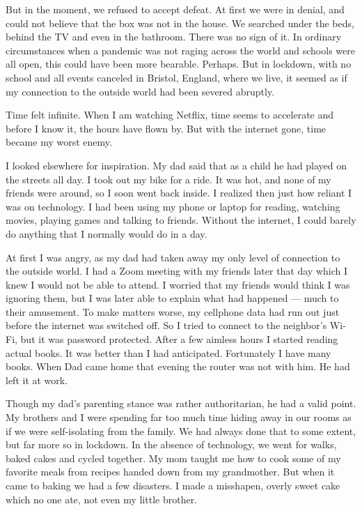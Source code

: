 But in the moment, we refused to accept defeat. At first we were in
denial, and could not believe that the box was not in the house. We
searched under the beds, behind the TV and even in the bathroom. There
was no sign of it. In ordinary circumstances when a pandemic was not
raging across the world and schools were all open, this could have been
more bearable. Perhaps. But in lockdown, with no school and all events
canceled in Bristol, England, where we live, it seemed as if my
connection to the outside world had been severed abruptly.

Time felt infinite. When I am watching Netflix, time seems to accelerate
and before I know it, the hours have flown by. But with the internet
gone, time became my worst enemy.

I looked elsewhere for inspiration. My dad said that as a child he had
played on the streets all day. I took out my bike for a ride. It was
hot, and none of my friends were around, so I soon went back inside. I
realized then just how reliant I was on technology. I had been using my
phone or laptop for reading, watching movies, playing games and talking
to friends. Without the internet, I could barely do anything that I
normally would do in a day.

At first I was angry, as my dad had taken away my only level of
connection to the outside world. I had a Zoom meeting with my friends
later that day which I knew I would not be able to attend. I worried
that my friends would think I was ignoring them, but I was later able to
explain what had happened --- much to their amusement. To make matters
worse, my cellphone data had run out just before the internet was
switched off. So I tried to connect to the neighbor's Wi-Fi, but it was
password protected. After a few aimless hours I started reading actual
books. It was better than I had anticipated. Fortunately I have many
books. When Dad came home that evening the router was not with him. He
had left it at work.

Though my dad's parenting stance was rather authoritarian, he had a
valid point. My brothers and I were spending far too much time hiding
away in our rooms as if we were self-isolating from the family. We had
always done that to some extent, but far more so in lockdown. In the
absence of technology, we went for walks, baked cakes and cycled
together. My mom taught me how to cook some of my favorite meals from
recipes handed down from my grandmother. But when it came to baking we
had a few disasters. I made a misshapen, overly sweet cake which no one
ate, not even my little brother.

